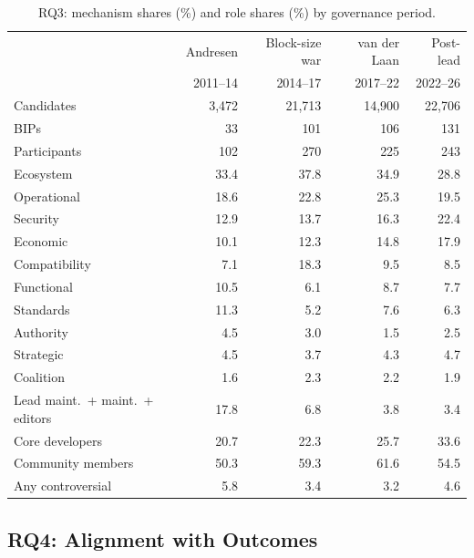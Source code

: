\documentclass[sigconf,screen]{acmart}
\begin{document}
\begin{table}[t]
\caption{RQ3: mechanism shares (\%) and role shares (\%) by governance period.}
\label{tab:eras}
\footnotesize
\setlength{\tabcolsep}{3pt}
\begin{tabular}{lrrrr}
\toprule
 & Andresen & Block-size war & van der Laan & Post-lead \\
 & 2011--14 & 2014--17 & 2017--22 & 2022--26 \\
\midrule
Candidates & 3,472 & 21,713 & 14,900 & 22,706 \\
BIPs & 33 & 101 & 106 & 131 \\
Participants & 102 & 270 & 225 & 243 \\
\midrule
Ecosystem & 33.4 & 37.8 & 34.9 & 28.8 \\
Operational & 18.6 & 22.8 & 25.3 & 19.5 \\
Security & 12.9 & 13.7 & 16.3 & 22.4 \\
Economic & 10.1 & 12.3 & 14.8 & 17.9 \\
Compatibility & 7.1 & 18.3 & 9.5 & 8.5 \\
Functional & 10.5 & 6.1 & 8.7 & 7.7 \\
Standards & 11.3 & 5.2 & 7.6 & 6.3 \\
Authority & 4.5 & 3.0 & 1.5 & 2.5 \\
Strategic & 4.5 & 3.7 & 4.3 & 4.7 \\
Coalition & 1.6 & 2.3 & 2.2 & 1.9 \\
\midrule
Lead maint.\ + maint.\ + editors & 17.8 & 6.8 & 3.8 & 3.4 \\
Core developers & 20.7 & 22.3 & 25.7 & 33.6 \\
Community members & 50.3 & 59.3 & 61.6 & 54.5 \\
\midrule
Any controversial & 5.8 & 3.4 & 3.2 & 4.6 \\
\bottomrule
\end{tabular}
\end{table}

\subsection{RQ4: Alignment with Outcomes}
\end{document}

